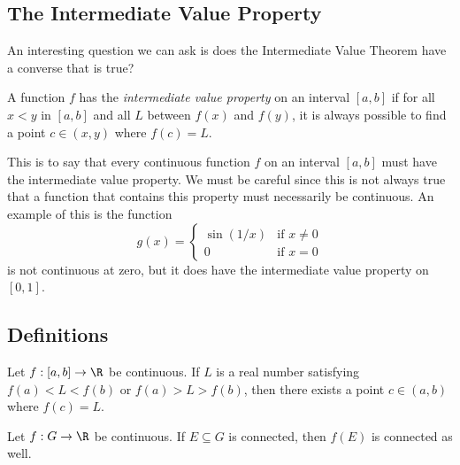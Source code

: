 \subsection{The Intermediate Value Property} 

An interesting question we can ask is does the Intermediate Value Theorem have a converse that is true?

\begin{tcolorbox}
\begin{defn}
    A function \( f  \) has the \textit{intermediate value property} on an interval \( [a,b] \) if for all \( x < y  \) in \( [a,b] \) and all \( L   \) between \( f(x)  \) and \( f(y) \), it is always possible to find a point \( c \in (x,y) \) where \( f(c) = L  \).
\end{defn}
\end{tcolorbox}

This is to say that every continuous function \( f \) on an interval \( [a,b] \) must have the intermediate value property. We must be careful since this is not always true that a function that contains this property must necessarily be continuous. An example of this is the function 
\[  g(x) = 
\begin{cases}
    \sin(1/x) &\text{if } x \neq 0 \\
    0 &\text{if } x = 0
\end{cases}  \]
is not continuous at zero, but it does have the intermediate value property on \( [0,1] \). 


\subsection{Definitions}


\begin{tcolorbox}
    \begin{thm}
    Let \( f: [a,b] \to \R  \) be continuous. If \( L  \) is a real number satisfying \( f(a) < L < f(b) \) or \( f(a) > L > f(b) \), then there exists a point \( c \in (a,b) \) where \( f(c) = L  \).
    \end{thm}
\end{tcolorbox}


\begin{tcolorbox}
    \begin{thm}
    Let \( f: G \to \R  \) be continuous. If \( E \subseteq G  \) is connected, then \( f(E) \) is connected as well.
    \end{thm}
\end{tcolorbox}


